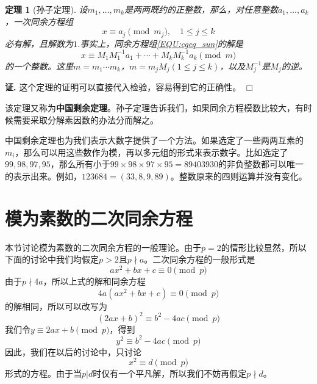 \documentclass{ctexrep}
\newcommand{\bbold}[1]{\textbf{#1}}
\newtheorem{thrm}{定理}[section]
\renewenvironment{proof}[1][证]{\noindent \textbf{#1.} }{\hfill$\Box$}
\begin{document}
\begin{thrm}[孙子定理]
设$m_1,\dotsc,m_k$是两两既约的正整数，那么，对任意整数$a_1,\dotsc,a_k$，一次同余方程组
\begin{equation}\label{EQU:cgeq_sun}
x\equiv a_j\pmod{m_j},\quad 1\leq j\leq k
\end{equation}
必有解，且解数为$1$.事实上，同余方程组\ref{EQU:cgeq_sun}的解是
\begin{displaymath}
x\equiv M_1 M_1^{-1}a_1+\dotsb+M_k M_k^{-1}a_k\pmod{m}
\end{displaymath}
的一个整数。这里$m=m_1\dotsm m_k$，$m=m_jM_j(1\leq j\leq k)$，以及$M_j^{-1}$是$M_j$的逆。
\end{thrm}
\begin{proof}
这个定理的证明可以直接代入检验，容易得到它的正确性。
\end{proof}

该定理又称为\bbold{中国剩余定理}。孙子定理告诉我们，如果同余方程模数比较大，有时候需要采取分解素因数的办法分而解之。

中国剩余定理也为我们表示大数字提供了一个方法。如果选定了一些两两互素的$m_i$，那么可以用这些数作为模，再以多元组的形式来表示数字。比如选定了$99,98,97,95$，那么所有小于$99\times 98\times 97\times 95=89403930$的非负整数都可以唯一的表示出来。例如，$123684=(33,8,9,89)$。整数原来的四则运算并没有变化。

\section{模为素数的二次同余方程}
本节讨论模为素数的二次同余方程的一般理论。由于$p=2$的情形比较显然，所以下面的讨论中我们均假定$p>2$且$p\nmid a$。二次同余方程的一般形式是
\begin{equation}
ax^2+bx+c\equiv 0\pmod{p}
\end{equation}
由于$p\nmid 4a$，所以上式的解和同余方程
\begin{displaymath}
4a(ax^2+bx+c)\equiv 0\pmod{p}
\end{displaymath}
的解相同，所以可以改写为
\begin{displaymath}
(2ax+b)^2\equiv b^2-4ac\pmod{p}
\end{displaymath}
我们令$y\equiv 2ax+b\pmod{p}$，得到
\begin{displaymath}
y^2\equiv b^2-4ac\pmod{p}
\end{displaymath}
因此，我们在以后的讨论中，只讨论
\begin{equation}\label{EQU:sub_cgeq}
x^2\equiv d\pmod{p}
\end{equation}
形式的方程。由于当$p|d$时仅有一个平凡解，所以我们不妨再假定$p\nmid d$。
\end{document}
